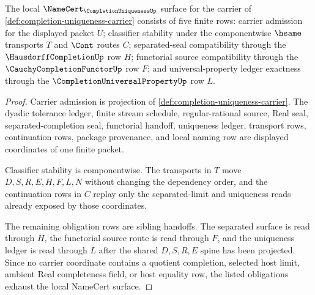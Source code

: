 \begin{theorem}
\label{thm:completion-uniqueness-namecert-obligations}
The local $\NameCert_{\CompletionUniquenessUp}$ surface for the carrier of \autoref{def:completion-uniqueness-carrier} consists of five finite rows: carrier admission for the displayed packet $U$; classifier stability under the componentwise $\hsame$ transports $T$ and $\Cont$ routes $C$; separated-seal compatibility through the $\HausdorffCompletionUp$ row $H$; functorial source compatibility through the $\CauchyCompletionFunctorUp$ row $F$; and universal-property ledger exactness through the $\CompletionUniversalPropertyUp$ row $L$.
\end{theorem}
\begin{proof}
Carrier admission is projection of \autoref{def:completion-uniqueness-carrier}. The dyadic tolerance ledger, finite stream schedule, regular-rational source, Real seal, separated-completion seal, functorial handoff, uniqueness ledger, transport rows, continuation rows, package provenance, and local naming row are displayed coordinates of one finite packet.

Classifier stability is componentwise. The transports in $T$ move $D,S,R,E,H,F,L,N$ without changing the dependency order, and the continuation rows in $C$ replay only the separated-limit and uniqueness reads already exposed by those coordinates.

The remaining obligation rows are sibling handoffs. The separated surface is read through $H$, the functorial source route is read through $F$, and the uniqueness ledger is read through $L$ after the shared $D,S,R,E$ spine has been projected. Since no carrier coordinate contains a quotient completion, selected host limit, ambient Real completeness field, or host equality row, the listed obligations exhaust the local NameCert surface.
\end{proof}

